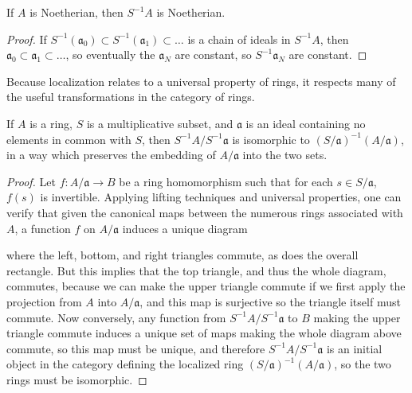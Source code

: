\begin{prop}
    If $A$ is Noetherian, then $S^{-1}A$ is Noetherian.
\end{prop}
\begin{proof}
    If $S^{-1}(\mathfrak{a}_0) \subset S^{-1}(\mathfrak{a}_1) \subset \dots$ is a chain of ideals in $S^{-1}A$, then $\mathfrak{a}_0 \subset \mathfrak{a}_1 \subset \dots$, so eventually the $\mathfrak{a}_N$ are constant, so $S^{-1}\mathfrak{a}_N$ are constant.
\end{proof}

Because localization relates to a universal property of rings, it respects many of the useful transformations in the category of rings.

\begin{prop}
    If $A$ is a ring, $S$ is a multiplicative subset, and $\mathfrak{a}$ is an ideal containing no elements in common with $S$, then $S^{-1}A/S^{-1}\mathfrak{a}$ is isomorphic to $(S/\mathfrak{a})^{-1}(A/\mathfrak{a})$, in a way which preserves the embedding of $A/\mathfrak{a}$ into the two sets.
\end{prop}
\begin{proof}
    Let $f: A/\mathfrak{a} \to B$ be a ring homomorphism such that for each $s \in S/\mathfrak{a}$, $f(s)$ is invertible. Applying lifting techniques and universal properties, one can verify that given the canonical maps between the numerous rings associated with $A$, a function $f$ on $A/\mathfrak{a}$ induces a unique diagram
    \begin{center}
    \end{center}
    where the left, bottom, and right triangles commute, as does the overall rectangle. But this implies that the top triangle, and thus the whole diagram, commutes, because we can make the upper triangle commute if we first apply the projection from $A$ into $A/\mathfrak{a}$, and this map is surjective so the triangle itself must commute. Now conversely, any function from $S^{-1}A/S^{-1}\mathfrak{a}$ to $B$ making the upper triangle commute induces a unique set of maps making the whole diagram above commute, so this map must be unique, and therefore $S^{-1}A/S^{-1}\mathfrak{a}$ is an initial object in the category defining the localized ring $(S/\mathfrak{a})^{-1}(A/\mathfrak{a})$, so the two rings must be isomorphic.
\end{proof}

